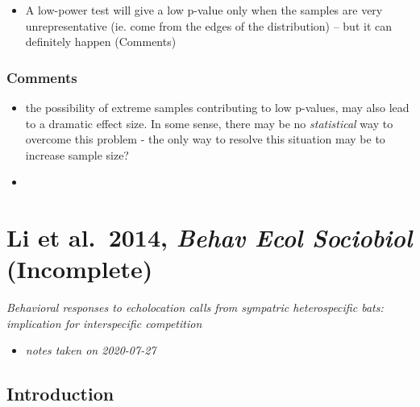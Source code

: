 \documentclass[
]{book}
\providecommand{\tightlist}{%
  \setlength{\itemsep}{0pt}\setlength{\parskip}{0pt}}
\begin{document}
\begin{itemize}
\tightlist
\item
  A low-power test will give a low p-value only when the samples are very unrepresentative (ie. come from the edges of the distribution) -- but it can definitely happen (Comments)
\end{itemize}

\hypertarget{comments-6}{%
\subsection{Comments}\label{comments-6}}

\begin{itemize}
\item
  the possibility of extreme samples contributing to low p-values, may also lead to a dramatic effect size. In some sense, there may be no \emph{statistical} way to overcome this problem - the only way to resolve this situation may be to increase sample size?
\item
\end{itemize}

\hypertarget{li-et-al.-2014-behav-ecol-sociobiol-incomplete}{%
\chapter{\texorpdfstring{Li et al.~2014, \emph{Behav Ecol Sociobiol} (Incomplete)}{Li et al.~2014, Behav Ecol Sociobiol (Incomplete)}}\label{li-et-al.-2014-behav-ecol-sociobiol-incomplete}}


\emph{Behavioral responses to echolocation calls from sympatric heterospecific bats: implication for interspecific competition} \citep{li2014behavioral}

\begin{itemize}
\tightlist
\item
  \emph{notes taken on 2020-07-27}
\end{itemize}

\hypertarget{introduction-7}{%
\section{Introduction}\label{introduction-7}}
\end{document}

